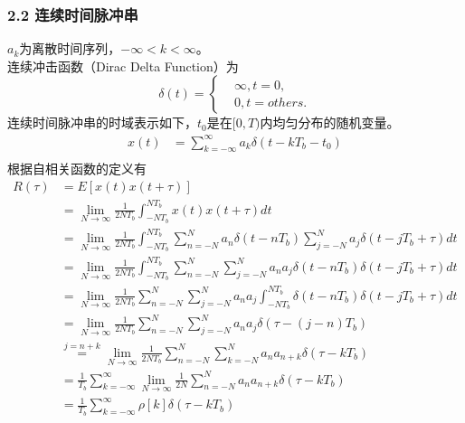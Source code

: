 \documentclass[
]{article}
\begin{document}
\hypertarget{header-n22}{%
\subsubsection{2.2 连续时间脉冲串}\label{header-n22}}

$a_k$为离散时间序列，$-\infty<k<\infty$。\\
连续冲击函数（Dirac Delta Function）为
\begin{equation}
\delta(t) =\left\{
\begin{aligned}
&\infty, t=0, \\
&0, t=others.
\end{aligned}
\right.
\end{equation}
连续时间脉冲串的时域表示如下，$t_0$是在$[0,T)$内均匀分布的随机变量。\\
\begin{equation}
\begin{aligned}
x(t) &= \sum\limits_{k=-\infty}^{\infty} a_k \delta(t-kT_b-t_0) \\
\end{aligned}
\end{equation}
根据自相关函数的定义有\\
\begin{equation}
\begin{aligned}
R(\tau) &= E[x(t)x(t+\tau)]\\
&= \lim\limits_{N \to \infty} \frac{1}{2NT_b} \int_{-NT_b}^{NT_b} x(t)x(t+\tau) dt\\
&= \lim\limits_{N \to \infty} \frac{1}{2NT_b} \int_{-NT_b}^{NT_b} \sum\limits_{n=-N}^{N} a_n \delta(t-nT_b) \sum\limits_{j=-N}^{N} a_j \delta(t-jT_b+\tau)dt\\
&= \lim\limits_{N \to \infty} \frac{1}{2NT_b} \int_{-NT_b}^{NT_b} \sum\limits_{n=-N}^{N} \sum\limits_{j=-N}^{N} a_n a_j \delta(t-nT_b) \delta(t-jT_b+\tau)dt\\
&= \lim\limits_{N \to \infty} \frac{1}{2NT_b} \sum\limits_{n=-N}^{N} \sum\limits_{j=-N}^{N} a_n a_j \int_{-NT_b}^{NT_b} \delta(t-nT_b) \delta(t-jT_b+\tau) dt\\
&= \lim\limits_{N \to \infty} \frac{1}{2NT_b} \sum\limits_{n=-N}^{N} \sum\limits_{j=-N}^{N} a_n a_j \delta(\tau-(j-n)T_b)\\
&\overset{j=n+k}= \lim\limits_{N \to \infty} \frac{1}{2NT_b} \sum\limits_{n=-N}^{N} \sum\limits_{k=-N}^{N} a_n a_{n+k} \delta(\tau-kT_b)\\
&= \frac{1}{T_b} \sum\limits_{k=-\infty}^{\infty} \lim\limits_{N \to \infty} \frac{1}{2N} \sum\limits_{n=-N}^{N} a_n a_{n+k} \delta(\tau-kT_b)\\
&= \frac{1}{T_b} \sum\limits_{k=-\infty}^{\infty} \rho[k] \delta(\tau-kT_b)\\
\end{aligned}
\end{equation}
\end{document}
